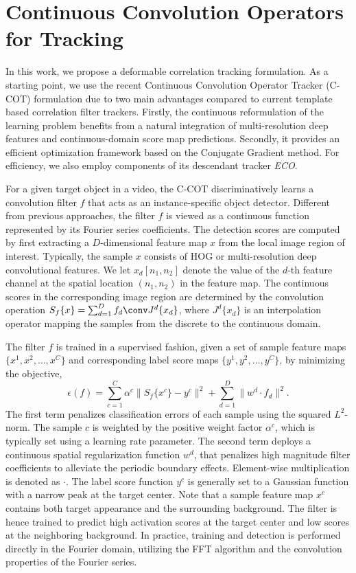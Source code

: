 \documentclass[runningheads,a4paper]{llncs}
\begin{document}
\section{Continuous Convolution Operators for Tracking}\label{sec:CCOT}
In this work, we propose a deformable correlation tracking formulation. As a starting point, we use the recent Continuous Convolution Operator Tracker (C-COT) formulation \cite{DanelljanECCV2016} due to two main advantages compared to current template based correlation filter trackers. Firstly, the continuous reformulation of the learning problem benefits from a natural integration of multi-resolution deep features and continuous-domain score map predictions. Secondly, it provides an efficient optimization framework based on the Conjugate Gradient method. For efficiency, we also employ components of its descendant tracker \emph{ECO}\cite{DanelljanCVPR2017}.

For a given target object in a video, the C-COT discriminatively learns a convolution filter $f$ that acts as an instance-specific object detector. Different from previous approaches, the filter $f$ is viewed as a continuous function represented by its Fourier series coefficients. The detection scores are computed by first extracting a $D$-dimensional feature map $x$ from the local image region of interest. Typically, the sample $x$ consists of HOG or multi-resolution deep convolutional features. We let $x_d[n_1,n_2]$ denote the value of the $d$-th feature channel at the spatial location $(n_1,n_2)$ in the feature map. The continuous scores in the corresponding image region are determined by the convolution operation $S_f\{x\} = \sum_{d=1}^D f_d \conv J^d\{x_d\}$, where $J^d\{x_d\}$ is an interpolation operator mapping the samples from the discrete to the continuous domain.

The filter $f$ is trained in a supervised fashion, given a set of sample feature maps $\{x^1,x^2,\dots,x^C\}$ and corresponding label score maps $\{y^1,y^2,\dots,y^C\}$, by minimizing the objective,
\begin{equation}
	\label{eq:ccot_training}
  \epsilon(f) = \sum_{c=1}^C\alpha^c\|S_f\{x^c\} - y^c\|^2 + \sum_{d=1}^D\|w^d\cdot f_d\|^2 .
\end{equation}
The first term penalizes classification errors of each sample using the squared $L^2$-norm. The sample $c$ is weighted by the positive weight factor $\alpha^c$, which is typically set using a learning rate parameter. The second term deploys a continuous spatial regularization function $w^d$, that penalizes high magnitude filter coefficients to alleviate the periodic boundary effects. Element-wise multiplication is denoted as $\cdot$. The label score function $y^c$ is generally set to a Gaussian function with a narrow peak at the target center. Note that a sample feature map $x^c$ contains both target appearance and the surrounding background. The filter is hence trained to predict high activation scores at the target center and low scores at the neighboring background. In practice, training and detection is performed directly in the Fourier domain, utilizing the FFT algorithm and the convolution properties of the Fourier series.
\end{document}
